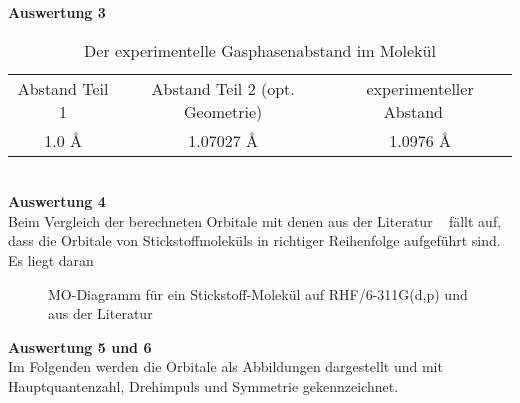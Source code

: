 \documentclass[12pt]{article}
\begin{document}
\begin{onehalfspace}
\textbf{Auswertung 3}\\
\begin{table}[!htpb]
\centering
\caption{Der experimentelle Gasphasenabstand im  Molekül }
\begin{tabular}{ccc}
\toprule
Abstand Teil 1 & Abstand Teil 2 (opt. Geometrie)  & experimenteller Abstand ~\supercite{holleman} \\
1.0 \si{\angstrom} & 1.07027 \si{\angstrom} & 1.0976 \si{\angstrom} \\
\midrule
\bottomrule
\end{tabular}
\end{table}\\
\noindent
\textbf{Auswertung 4}\\


Beim Vergleich der berechneten Orbitale mit denen aus der Literatur ~\supercite{ritaatom} fällt auf,
 dass die Orbitale von Stickstoffmoleküls in richtiger Reihenfolge aufgeführt sind. Es liegt daran

\begin{figure}[!hptb]


\caption{MO-Diagramm für ein Stickstoff-Molekül auf RHF/6-311G(d,p) und aus der Literatur ~\supercite{ritaatom}}

\end{figure}





\textbf{Auswertung 5 und 6} \\
Im Folgenden werden die Orbitale als
Abbildungen dargestellt und mit Hauptquantenzahl, Drehimpuls und Symmetrie
gekennzeichnet.
\begin{figure}[!hptb]
    \centering
    \begin{subfigure}[b]{0.4\textwidth}
    \end{subfigure}
    \begin{subfigure}[b]{0.4\textwidth}
    \end{subfigure}

\end{figure}

\begin{figure}[!hptb]
    \centering
    \begin{subfigure}[b]{0.4\textwidth}
    \end{subfigure}
    ~ %
    \begin{subfigure}[b]{0.4\textwidth}
    \end{subfigure}


\end{figure}
\end{onehalfspace}
\end{document}
